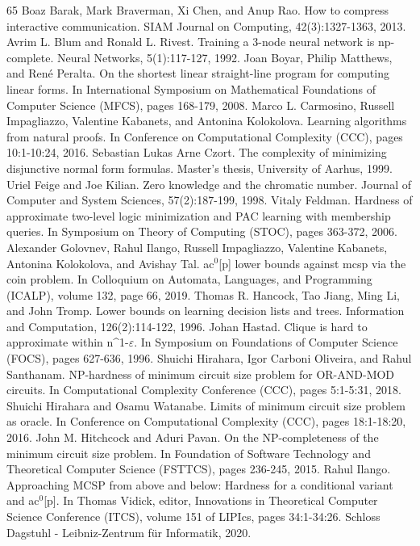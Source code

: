 \documentclass[10pt,a4paper]{article}
\begin{document}
\begin{thebibliography}{65}
 Boaz Barak, Mark Braverman, Xi Chen, and Anup Rao. How to compress interactive communication. SIAM Journal on Computing, 42(3):1327-1363, 2013.
 Avrim L. Blum and Ronald L. Rivest. Training a 3-node neural network is np-complete. Neural Networks, 5(1):117-127, 1992.
 Joan Boyar, Philip Matthews, and René Peralta. On the shortest linear straight-line program for computing linear forms. In International Symposium on Mathematical Foundations of Computer Science (MFCS), pages 168-179, 2008.
 Marco L. Carmosino, Russell Impagliazzo, Valentine Kabanets, and Antonina Kolokolova. Learning algorithms from natural proofs. In Conference on Computational Complexity (CCC), pages 10:1-10:24, 2016.
 Sebastian Lukas Arne Czort. The complexity of minimizing disjunctive normal form formulas. Master’s thesis, University of Aarhus, 1999.
 Uriel Feige and Joe Kilian. Zero knowledge and the chromatic number. Journal of Computer and System Sciences, 57(2):187-199, 1998.
 Vitaly Feldman. Hardness of approximate two-level logic minimization and PAC learning with membership queries. In Symposium on Theory of Computing (STOC), pages 363-372, 2006.
 Alexander Golovnev, Rahul Ilango, Russell Impagliazzo, Valentine Kabanets, Antonina Kolokolova, and Avishay Tal. ac$^0$[p] lower bounds against mcsp via the coin problem. In Colloquium on Automata, Languages, and Programming (ICALP), volume 132, page 66, 2019.
 Thomas R. Hancock, Tao Jiang, Ming Li, and John Tromp. Lower bounds on learning decision lists and trees. Information and Computation, 126(2):114-122, 1996.
 Johan Hastad. Clique is hard to approximate within n\textasciicircum{}1-$\varepsilon$. In Symposium on Foundations of Computer Science (FOCS), pages 627-636, 1996.
 Shuichi Hirahara, Igor Carboni Oliveira, and Rahul Santhanam. NP-hardness of minimum circuit size problem for OR-AND-MOD circuits. In Computational Complexity Conference (CCC), pages 5:1-5:31, 2018.
 Shuichi Hirahara and Osamu Watanabe. Limits of minimum circuit size problem as oracle. In Conference on Computational Complexity (CCC), pages 18:1-18:20, 2016.
 John M. Hitchcock and Aduri Pavan. On the NP-completeness of the minimum circuit size problem. In Foundation of Software Technology and Theoretical Computer Science (FSTTCS), pages 236-245, 2015.
 Rahul Ilango. Approaching MCSP from above and below: Hardness for a conditional variant and ac$^0$[p]. In Thomas Vidick, editor, Innovations in Theoretical Computer Science Conference (ITCS), volume 151 of LIPIcs, pages 34:1-34:26. Schloss Dagstuhl - Leibniz-Zentrum für Informatik, 2020.

\end{thebibliography}
\end{document}
